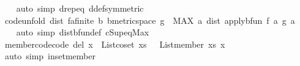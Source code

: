 \begin{isabellebody}
\ \ \isamarkupfalse%
\ {\isacharparenleft}{\kern0pt}auto\ simp{\isacharcolon}{\kern0pt}\ d{}{\isacharprime}{\kern0pt}{\isachardot}{\kern0pt}rep{\isacharunderscore}{\kern0pt}eq\ d{}{\isacharunderscore}{\kern0pt}def{\isacharbrackleft}{\kern0pt}symmetric{\isacharbrackright}{\kern0pt}{\isacharparenright}{\kern0pt}%
\endisatagproof
{\isafoldproof}%
%
\isadelimproof
\isanewline
%
\endisadelimproof
{}\isamarkupfalse%
%
\isadelimdocument
%
\endisadelimdocument
%
\isatagdocument
%
\isamarkuptrue%
%
\endisatagdocument
{\isafolddocument}%
%
\isadelimdocument
%
\endisadelimdocument
{}\isamarkupfalse%
\ {\isacharbrackleft}{\kern0pt}code{\isacharunderscore}{\kern0pt}unfold{\isacharbrackright}{\kern0pt}{\isacharcolon}{\kern0pt}\ {\isachardoublequoteopen}dist\ {\isacharparenleft}{\kern0pt}f{\isacharcolon}{\kern0pt}{\isacharcolon}{\kern0pt}{\isacharprime}{\kern0pt}a{\isacharcolon}{\kern0pt}{\isacharcolon}{\kern0pt}finite\ {\isasymRightarrow}\isactrlsub b\ {\isacharprime}{\kern0pt}b{\isacharcolon}{\kern0pt}{\isacharcolon}{\kern0pt}metric{\isacharunderscore}{\kern0pt}space{\isacharparenright}{\kern0pt}\ g\ {\isacharequal}{\kern0pt}\ {\isacharparenleft}{\kern0pt}MAX\ a{\isachardot}{\kern0pt}\ dist\ {\isacharparenleft}{\kern0pt}apply{\isacharunderscore}{\kern0pt}bfun\ f\ a{\isacharparenright}{\kern0pt}\ {\isacharparenleft}{\kern0pt}g\ a{\isacharparenright}{\kern0pt}{\isacharparenright}{\kern0pt}{\isachardoublequoteclose}\ \isanewline
%
\isadelimproof
\ \ %
\endisadelimproof
%
\isatagproof
{}\isamarkupfalse%
\ {\isacharparenleft}{\kern0pt}auto\ simp{\isacharcolon}{\kern0pt}\ dist{\isacharunderscore}{\kern0pt}bfun{\isacharunderscore}{\kern0pt}def\ cSup{\isacharunderscore}{\kern0pt}eq{\isacharunderscore}{\kern0pt}Max{\isacharparenright}{\kern0pt}%
\endisatagproof
{\isafoldproof}%
%
\isadelimproof
\isanewline
%
\endisadelimproof
\isanewline
{}\isamarkupfalse%
\ member{\isacharunderscore}{\kern0pt}code{\isacharbrackleft}{\kern0pt}code\ del{\isacharbrackright}{\kern0pt}{\isacharcolon}{\kern0pt}\ {\isachardoublequoteopen}x\ {\isasymin}\ List{\isachardot}{\kern0pt}coset\ xs\ {\isasymlongleftrightarrow}\ {\isasymnot}\ List{\isachardot}{\kern0pt}member\ xs\ x{\isachardoublequoteclose}\isanewline
%
\isadelimproof
\ \ %
\endisadelimproof
%
\isatagproof
{}\isamarkupfalse%
\ {\isacharparenleft}{\kern0pt}auto\ simp{\isacharcolon}{\kern0pt}\ in{\isacharunderscore}{\kern0pt}set{\isacharunderscore}{\kern0pt}member{\isacharparenright}{\kern0pt}%

\end{isabellebody}
